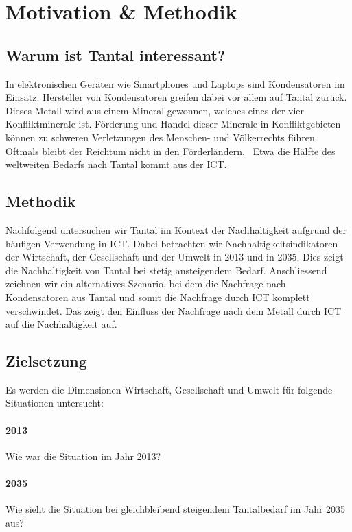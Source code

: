 \section{Motivation \& Methodik}\label{sec:motivation}

\subsection{Warum ist Tantal interessant?}

In elektronischen Geräten wie Smartphones und Laptops sind Kondensatoren im Einsatz.
Hersteller von Kondensatoren greifen dabei vor allem auf Tantal zurück. Dieses Metall wird aus einem Mineral gewonnen, welches eines der vier Konfliktminerale ist.
Förderung und Handel dieser Minerale in Konfliktgebieten können zu schweren Verletzungen des Menschen- und Völkerrechts führen. Oftmals bleibt der Reichtum nicht in den Förderländern.~\cite{conflict_minerals}
Etwa die Hälfte des weltweiten Bedarfs nach Tantal kommt aus der ICT.~\cite{why_tantal}

\subsection{Methodik}

Nachfolgend untersuchen wir Tantal im Kontext der Nachhaltigkeit aufgrund der häufigen Verwendung in ICT. Dabei betrachten wir Nachhaltigkeitsindikatoren der Wirtschaft, der Gesellschaft und der Umwelt in 2013 und in 2035. Dies zeigt die Nachhaltigkeit von Tantal bei stetig ansteigendem Bedarf.
Anschliessend zeichnen wir ein alternatives Szenario, bei dem die Nachfrage nach Kondensatoren aus Tantal und somit die Nachfrage durch ICT komplett verschwindet. Das zeigt den Einfluss der Nachfrage nach dem Metall durch ICT auf die Nachhaltigkeit auf.

\subsection{Zielsetzung}

Es werden die Dimensionen Wirtschaft, Gesellschaft und Umwelt für folgende Situationen untersucht:

\paragraph{2013}
Wie war die Situation im Jahr 2013?
\paragraph{2035}
Wie sieht die Situation bei gleichbleibend steigendem Tantalbedarf im Jahr 2035 aus?
